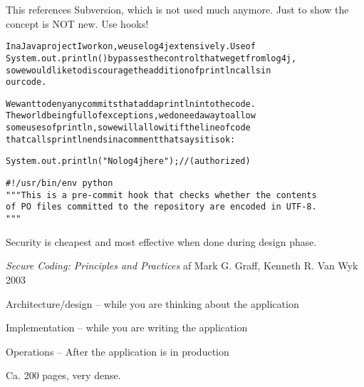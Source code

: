 \documentclass[Screen16to9,17pt]{foils}
\begin{document}
This references Subversion, which is not used much anymore. Just to show the concept is NOT new. Use hooks!


\begin{alltt}
In a Java project I work on, we use log4j extensively.  Use of
System.out.println() bypasses the control that we get from log4j,
so we would like to discourage the addition of println calls in
our code.

We want to deny any commits that add a println into the code.
The world being full of exceptions, we do need a way to allow
some uses of println, so we will allow it if the line of code
that calls println ends in a comment that says it is ok:

   System.out.println("No log4j here"); // (authorized)
\end{alltt}

{\small {}}




\begin{verbatim}
#!/usr/bin/env python
"""This is a pre-commit hook that checks whether the contents
of PO files committed to the repository are encoded in UTF-8.
"""
\end{verbatim}

{\small {}}


\centerline{Security is cheapest and most effective when done during design phase.}




\vskip 2cm
{\emph{Secure Coding: Principles and Practices} af Mark G. Graff, Kenneth R. Van Wyk 2003}



\begin{list1}
\item Architecture/design -- while you are thinking about the application
\item Implementation -- while you are writing the application
\item Operations -- After the application is in production
\item Ca. 200 pages, very dense.
\end{list1}
\end{document}
